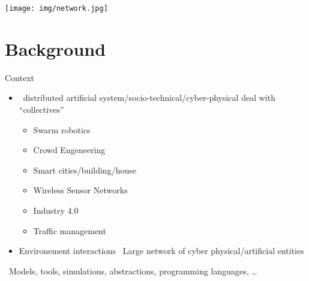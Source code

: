 \documentclass[8pt, aspectratio=169, handout]{beamer}
\begin{document}
\begin{frame}[plain]
  \begin{backgroundblock} 
    \texttt{[image: img/network.jpg]} 
  \end{backgroundblock} 
\titlepage
\end{frame}
\addtocounter{framenumber}{-1}
\section{Background}
\begin{frame}{Context}
  \begin{card}
    \begin{itemize}
      \item {} \faArrowRight \, distributed artificial system/socio-technical/cyber-physical deal with ``collectives''
      \begin{multicols}{2}
      \begin{itemize}
        \item Swarm robotics
        \item Crowd Engeneering
        \item Smart cities/building/house
      \end{itemize}
      \begin{itemize}
        \item Wireless Sensor Networks
        \item Industry 4.0
        \item Traffic management
      \end{itemize}
      \end{multicols}
      \item Environement interactions \faPlus \, Large network of cyber physical/artificial entities
    \end{itemize}
  \end{card}
  \begin{alarm}
     \faArrowRight \, Models, tools, simulations, abstractions, programming languages, \dots
  \end{alarm}
\end{frame}
\end{document}
